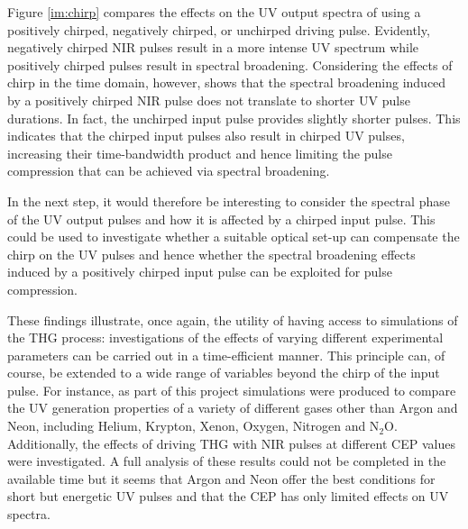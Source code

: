 \documentclass[a4paper]{jpconf}
\begin{document}
Figure \ref{im:chirp} compares the effects on the UV output spectra of using a positively chirped, negatively chirped, or unchirped driving pulse. Evidently,  negatively chirped NIR pulses result in a more intense UV spectrum while positively chirped pulses result in spectral broadening. Considering the effects of chirp in the time domain, however, shows that the spectral broadening induced by a positively chirped NIR pulse does not translate to shorter UV pulse durations. In fact, the unchirped input pulse provides slightly shorter pulses. This indicates that the chirped input pulses also result in chirped UV pulses, increasing their time-bandwidth product and hence limiting the pulse compression that can be achieved via spectral broadening. \par 
In the next step, it would therefore be interesting to consider the spectral phase of the UV output pulses and how it is affected by a chirped input pulse. This could be used to investigate whether a suitable optical set-up can compensate the chirp on the UV pulses and hence whether the spectral broadening effects  induced by a positively chirped input pulse can be exploited for pulse compression. \par 
These findings illustrate, once again, the utility of having access to simulations of the THG process:   
investigations of the effects of varying different experimental parameters can be carried out in a time-efficient manner. This principle can, of course, be extended to a wide range of variables beyond the chirp of the input pulse. For instance, as part of this project simulations were produced to compare the UV generation properties of a variety of different gases other than Argon and Neon, including Helium, Krypton, Xenon, Oxygen, Nitrogen and N$_2$O. Additionally, the effects of driving THG with NIR pulses at different CEP values were investigated. A full analysis of these results could not be completed in the available time but it seems that Argon and Neon offer the best conditions for short but energetic UV pulses and that the CEP has only limited effects on UV spectra. 
\end{document}
